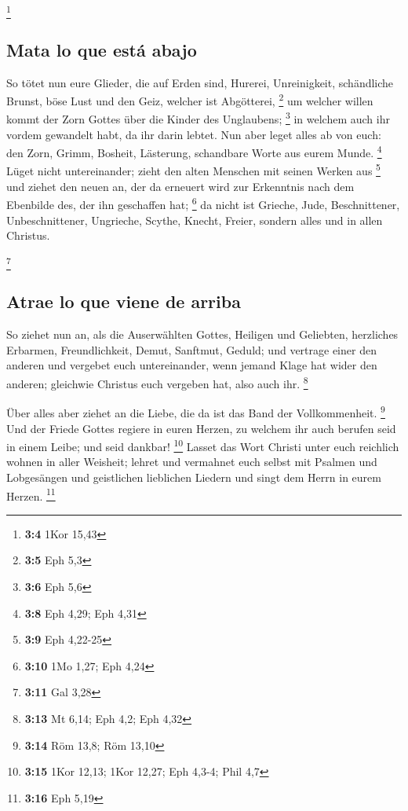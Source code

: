 \footnote{\textbf{3:4} 1Kor 15,43}

\hypertarget{mata-lo-que-estuxe1-abajo}{%
\subsection{Mata lo que está abajo}\label{mata-lo-que-estuxe1-abajo}}

 So tötet nun eure Glieder, die auf Erden sind, Hurerei,
Unreinigkeit, schändliche Brunst, böse Lust und den Geiz, welcher ist
Abgötterei, \footnote{\textbf{3:5} Eph 5,3}  um welcher
willen kommt der Zorn Gottes über die Kinder des Unglaubens; \footnote{\textbf{3:6}
  Eph 5,6}  in welchem auch ihr vordem gewandelt habt, da
ihr darin lebtet.  Nun aber leget alles ab von euch: den
Zorn, Grimm, Bosheit, Lästerung, schandbare Worte aus eurem Munde.
\footnote{\textbf{3:8} Eph 4,29; Eph 4,31}  Lüget nicht
untereinander; zieht den alten Menschen mit seinen Werken aus
\footnote{\textbf{3:9} Eph 4,22-25}  und ziehet den neuen
an, der da erneuert wird zur Erkenntnis nach dem Ebenbilde des, der ihn
geschaffen hat; \footnote{\textbf{3:10} 1Mo 1,27; Eph 4,24}
 da nicht ist Grieche, Jude, Beschnittener,
Unbeschnittener, Ungrieche, Scythe, Knecht, Freier, sondern alles und in
allen Christus.

\footnote{\textbf{3:11} Gal 3,28}

\hypertarget{atrae-lo-que-viene-de-arriba}{%
\subsection{Atrae lo que viene de
arriba}\label{atrae-lo-que-viene-de-arriba}}

 So ziehet nun an, als die Auserwählten Gottes, Heiligen
und Geliebten, herzliches Erbarmen, Freundlichkeit, Demut, Sanftmut,
Geduld;  und vertrage einer den anderen und vergebet euch
untereinander, wenn jemand Klage hat wider den anderen; gleichwie
Christus euch vergeben hat, also auch ihr. \footnote{\textbf{3:13} Mt
  6,14; Eph 4,2; Eph 4,32}

 Über alles aber ziehet an die Liebe, die da ist das Band
der Vollkommenheit. \footnote{\textbf{3:14} Röm 13,8; Röm 13,10}
 Und der Friede Gottes regiere in euren Herzen, zu
welchem ihr auch berufen seid in einem Leibe; und seid dankbar!
\footnote{\textbf{3:15} 1Kor 12,13; 1Kor 12,27; Eph 4,3-4; Phil 4,7}
 Lasset das Wort Christi unter euch reichlich wohnen in
aller Weisheit; lehret und vermahnet euch selbst mit Psalmen und
Lobgesängen und geistlichen lieblichen Liedern und singt dem Herrn in
eurem Herzen. \footnote{\textbf{3:16} Eph 5,19}


